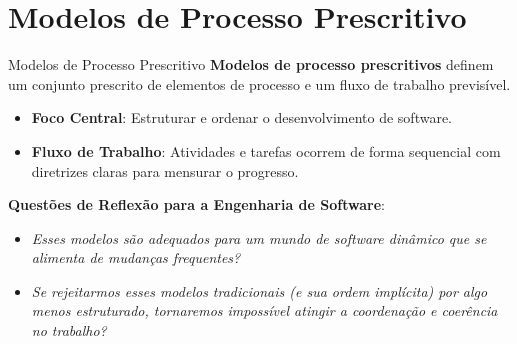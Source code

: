 \documentclass[9pt]{beamer}
\begin{document}
\section{Modelos de Processo Prescritivo}
\begin{frame}{Modelos de Processo Prescritivo}
  \textbf{Modelos de processo prescritivos} definem um conjunto prescrito de elementos de processo e um fluxo de trabalho previsível.

  \vspace{0.3cm}
  \begin{itemize}
    \item \textbf{Foco Central}: Estruturar e ordenar o desenvolvimento de software.
    \item \textbf{Fluxo de Trabalho}: Atividades e tarefas ocorrem de forma sequencial com diretrizes claras para mensurar o progresso.
  \end{itemize}

  \vspace{0.4cm}
  \textbf{Questões de Reflexão para a Engenharia de Software}:
  \begin{itemize}
    \item \textit{Esses modelos são adequados para um mundo de software dinâmico que se alimenta de mudanças frequentes?}
    \item \textit{Se rejeitarmos esses modelos tradicionais (e sua ordem implícita) por algo menos estruturado, tornaremos impossível atingir a coordenação e coerência no trabalho?}
  \end{itemize}
\end{frame}

\end{document}
